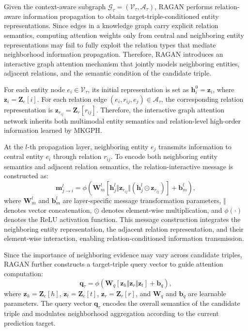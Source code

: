 \documentclass[a4paper,fleqn]{cas-sc}
\begin{document}
Given the context-aware subgraph $\mathcal{G}_{\tau}=(\mathcal{V}_{\tau},\mathcal{A}_{\tau})$, RAGAN performs relation-aware information propagation to obtain target-triple-conditioned entity representations. Since edges in a knowledge graph carry explicit relation semantics, computing attention weights only from central and neighboring entity representations may fail to fully exploit the relation types that mediate neighborhood information propagation. Therefore, RAGAN introduces an interactive graph attention mechanism that jointly models neighboring entities, adjacent relations, and the semantic condition of the candidate triple.

For each entity node $e_i\in\mathcal{V}_{\tau}$, its initial representation is set as $\mathbf{h}_{i}^{0}=\mathbf{z}_{i}$, where $\mathbf{z}_{i}=\mathbf{Z}_{e}[i]$. For each relation edge $(e_i,r_{ij},e_j)\in\mathcal{A}_{\tau}$, the corresponding relation representation is $\mathbf{z}_{r_{ij}}=\mathbf{Z}_{r}[r_{ij}]$. Therefore, the interactive graph attention network inherits both multimodal entity semantics and relation-level high-order information learned by MKGPH.

At the $l$-th propagation layer, neighboring entity $e_j$ transmits information to central entity $e_i$ through relation $r_{ij}$. To encode both neighboring entity semantics and adjacent relation semantics, the relation-interactive message is constructed as:
\begin{equation}
\mathbf{m}_{j\rightarrow i}^{l}
=
\phi
\left(
\mathbf{W}_{m}^{l}
\left[
\mathbf{h}_{j}^{l}
\Vert
\mathbf{z}_{r_{ij}}
\Vert
\left(
\mathbf{h}_{j}^{l}
\odot
\mathbf{z}_{r_{ij}}
\right)
\right]
+
\mathbf{b}_{m}^{l}
\right),
\end{equation}
where $\mathbf{W}_{m}^{l}$ and $\mathbf{b}_{m}^{l}$ are layer-specific message transformation parameters, $\Vert$ denotes vector concatenation, $\odot$ denotes element-wise multiplication, and $\phi(\cdot)$ denotes the ReLU activation function. This message construction integrates the neighboring entity representation, the adjacent relation representation, and their element-wise interaction, enabling relation-conditioned information transmission.

Since the importance of neighboring evidence may vary across candidate triples, RAGAN further constructs a target-triple query vector to guide attention computation:
\begin{equation}
\mathbf{q}_{\tau}
=
\phi
\left(
\mathbf{W}_{q}
\left[
\mathbf{z}_{h}
\Vert
\mathbf{z}_{r}
\Vert
\mathbf{z}_{t}
\right]
+
\mathbf{b}_{q}
\right),
\end{equation}
where $\mathbf{z}_{h}=\mathbf{Z}_{e}[h]$, $\mathbf{z}_{t}=\mathbf{Z}_{e}[t]$, $\mathbf{z}_{r}=\mathbf{Z}_{r}[r]$, and $\mathbf{W}_{q}$ and $\mathbf{b}_{q}$ are learnable parameters. The query vector $\mathbf{q}_{\tau}$ encodes the overall semantics of the candidate triple and modulates neighborhood aggregation according to the current prediction target.
\end{document}
